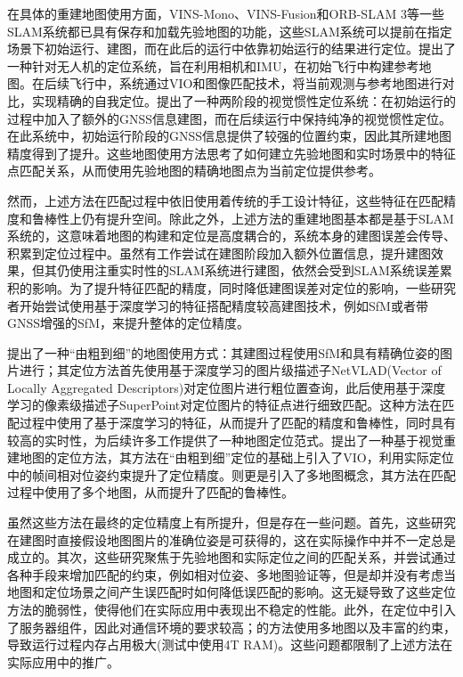 在具体的重建地图使用方面，VINS-Mono、VINS-Fusion和ORB-SLAM 3等一些SLAM系统都已具有保存和加载先验地图的功能，这些SLAM系统可以提前在指定场景下初始运行、建图，而在此后的运行中依靠初始运行的结果进行定位。\citet{surber2017robust}提出了一种针对无人机的定位系统，旨在利用相机和IMU，在初始飞行中构建参考地图。在后续飞行中，系统通过VIO和图像匹配技术，将当前观测与参考地图进行对比，实现精确的自我定位。\citet{hao2023global}提出了一种两阶段的视觉惯性定位系统：在初始运行的过程中加入了额外的GNSS信息建图，而在后续运行中保持纯净的视觉惯性定位。在此系统中，初始运行阶段的GNSS信息提供了较强的位置约束，因此其所建地图精度得到了提升。这些地图使用方法思考了如何建立先验地图和实时场景中的特征点匹配关系，从而使用先验地图的精确地图点为当前定位提供参考。

然而，上述方法在匹配过程中依旧使用着传统的手工设计特征，这些特征在匹配精度和鲁棒性上仍有提升空间。除此之外，上述方法的重建地图基本都是基于SLAM系统的，这意味着地图的构建和定位是高度耦合的，系统本身的建图误差会传导、积累到定位过程中。虽然有工作\cite{hao2023global}尝试在建图阶段加入额外位置信息，提升建图效果，但其仍使用注重实时性的SLAM系统进行建图，依然会受到SLAM系统误差累积的影响。为了提升特征匹配的精度，同时降低建图误差对定位的影响，一些研究者开始尝试使用基于深度学习的特征搭配精度较高建图技术，例如SfM或者带GNSS增强的SfM\cite{vincentqin2022colmapgps}，来提升整体的定位精度。

\citet{sarlin2019coarse}提出了一种“由粗到细”的地图使用方式：其建图过程使用SfM和具有精确位姿的图片进行；其定位方法首先使用基于深度学习的图片级描述子NetVLAD(Vector of Locally Aggregated Descriptors)\cite{arandjelovic2016netvlad}对定位图片进行粗位置查询，此后使用基于深度学习的像素级描述子SuperPoint\cite{detone2018superpoint}对定位图片的特征点进行细致匹配。这种方法在匹配过程中使用了基于深度学习的特征，从而提升了匹配的精度和鲁棒性，同时具有较高的实时性，为后续许多工作提供了一种地图定位范式。\citet{yang2022real}提出了一种基于视觉重建地图的定位方法，其方法在“由粗到细”定位的基础上引入了VIO，利用实际定位中的帧间相对位姿约束提升了定位精度。\citet{lin2023visual}则更是引入了多地图概念，其方法在匹配过程中使用了多个地图，从而提升了匹配的鲁棒性。

虽然这些方法在最终的定位精度上有所提升，但是存在一些问题。首先，这些研究在建图时直接假设地图图片的准确位姿是可获得的，这在实际操作中并不一定总是成立的。其次，这些研究聚焦于先验地图和实际定位之间的匹配关系，并尝试通过各种手段来增加匹配的约束，例如相对位姿、多地图验证等，但是却并没有考虑当地图和定位场景之间产生误匹配时如何降低误匹配的影响。这无疑导致了这些定位方法的脆弱性，使得他们在实际应用中表现出不稳定的性能。此外，\citet{yang2022real}在定位中引入了服务器组件，因此对通信环境的要求较高；\citet{lin2023visual}的方法使用多地图以及丰富的约束，导致运行过程内存占用极大(测试中使用4T RAM)。这些问题都限制了上述方法在实际应用中的推广。

